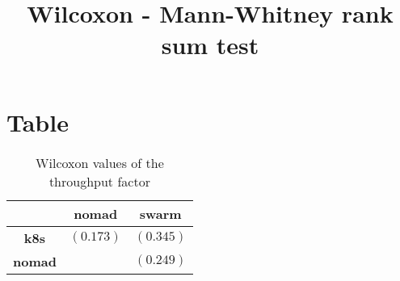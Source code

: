 \documentclass{article}
\title{Wilcoxon - Mann-Whitney rank sum test}
\author{}
\begin{document}
\maketitle
\section{Table}
\begin{table}[!htp]
  \caption{Wilcoxon values of the throughput factor}
  \label{table:throughput}
  \centering
  \begin{scriptsize}
  \begin{tabular}{c|cc}
      & \textbf{nomad} & \textbf{swarm} \\\hline
      \textbf{k8s} & $(0.173) $ & $ (0.345)$ \\
      \textbf{nomad} & $ $ & $ (0.249)$ \\
  \end{tabular}
  \end{scriptsize}
\end{table}
\end{document}
